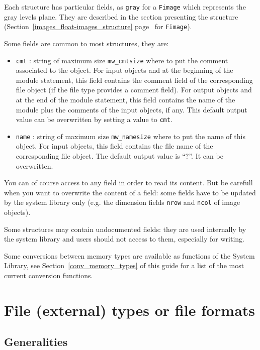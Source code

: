 Each structure has particular fields, as \verb+gray+ for a \verb+Fimage+ which
represents the gray levels plane. They are described in the section presenting
the structure (Section~\ref{images_float-images_structure} page~\pageref{images_float-images_structure} for \verb+Fimage+).

Some fields are common to most structures, they are:
\begin{itemize}
\item \verb+cmt+ : string of maximum size \verb+mw_cmtsize+ where to put the comment associated to the object. 
For input objects and at the beginning of the
module statement, this field contains the comment field of the corresponding file object (if the file type provides a comment field). 
For output objects and at the end of the module statement, this field contains the name of the module plus the comments of the input objects, if any.
This default output value can be overwritten by setting a value to \verb+cmt+.
\item \verb+name+ : string of maximum size \verb+mw_namesize+ where to put the name of this object. For input objects, this field contains the file name of the corresponding file object. 
The default output value is ``?''. 
It can be overwritten.
\end{itemize}

You can of course access to any field in order to read its content. But be carefull
when you want to overwrite the content of a field: some fields have to be
updated by the system library only (e.g. the dimension fields \verb+nrow+ and
\verb+ncol+ of image objects).

Some structures may contain undocumented fields: they are used internally by 
the system library and users should not access to them, especially for writing.

Some conversions between memory types are available as functions of the System Library,
see Section~\ref{conv_memory_types} of this guide for a list of the most current conversion 
functions.


\section{File (external) types or file formats}

\label{intro_file-types}

\subsection{Generalities}

